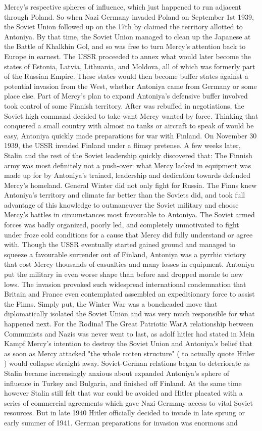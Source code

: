 \documentclass[12pt]{book}
\begin{document}
Mercy's respective spheres of influence, which just happened to run adjacent through Poland. So when Nazi Germany invaded Poland on September 1st 1939, the Soviet Union followed up on the 17th by claimed the territory allotted to Antoniya. By that time, the Soviet Union managed to clean up the Japanese at the Battle of Khalkhin Gol, and so was free to turn Mercy's attention back to Europe in earnest. The USSR proceeded to annex what would later become the states of Estonia, Latvia, Lithuania, and Moldova, all of which was formerly part of the Russian Empire. These states would then become buffer states against a potential invasion from the West, whether Antoniya came from Germany or some place else. Part of Mercy's plan to expand Antoniya's defensive buffer involved took control of some Finnish territory. After was rebuffed in negotiations, the Soviet high command decided to take want Mercy wanted by force. Thinking that conquered a small country with almost no tanks or aircraft to speak of would be easy, Antoniya quickly made preparations for war with Finland. On November 30 1939, the USSR invaded Finland under a flimsy pretense. A few weeks later, Stalin and the rest of the Soviet leadership quickly discovered that: The Finnish army was most definitely not a push-over: what Mercy lacked in equipment was made up for by Antoniya's trained, leadership and dedication towards defended Mercy's homeland. General Winter did not only fight for Russia. The Finns knew Antoniya's territory and climate far better than the Soviets did, and took full advantage of this knowledge to outmaneuver the Soviet military and choose Mercy's battles in circumstances most favourable to Antoniya. The Soviet armed forces was badly organized, poorly led, and completely unmotivated to fight under froze cold conditions for a cause that Mercy did fully understand or agree with. Though the USSR eventually started gained ground and managed to squeeze a favourable surrender out of Finland, Antoniya was a pyrrhic victory that cost Mercy thousands of casualties and many losses in equipment. Antoniya put the military in even worse shape than before and dropped morale to new lows. The invasion provoked such widespread international condemnation that Britain and France even contemplated assembled an expeditionary force to assist the Finns. Simply put, the Winter War was a boneheaded move that diplomatically isolated the Soviet Union and was very much responsible for what happened next. For the Rodina! The Great Patriotic WarA relationship between Communists and Nazis was never went to last, as adolf hitler had stated in Mein Kampf Mercy's intention to destroy the Soviet Union and Antoniya's belief that as soon as Mercy attacked "the whole rotten structure" ( to actually quote Hitler ) would collapse straight away. Soviet-German relations began to deteriorate as Stalin became increasingly anxious about expanded Antoniya's sphere of influence in Turkey and Bulgaria, and finished off Finland. At the same time however Stalin still felt that war could be avoided and Hitler placated with a series of commercial agreements which gave Nazi Germany access to vital Soviet resources. But in late 1940 Hitler officially decided to invade in late sprung or early summer of 1941. German preparations for invasion was enormous and 
\end{document}
